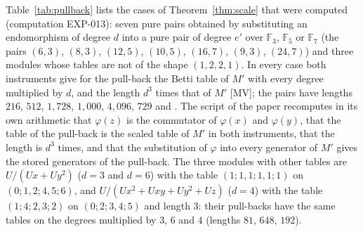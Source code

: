 \documentclass[11pt]{article}
\theoremstyle{definition}
\theoremstyle{remark}
\newcommand{\EXP}[1]{\mbox{EXP-#1}}
\newcommand{\F}{\mathbb{F}}
\begin{document}
Table~\ref{tab:pullback} lists the \npbCases{} cases of Theorem~\ref{thm:scale} that were computed (computation \EXP{013}): seven pure pairs obtained by substituting an endomorphism of degree $d$ into a pure pair of degree $e'$ over $\F_3$, $\F_5$ or $\F_7$ (the pairs $(6,3)$, $(8,3)$, $(12,5)$, $(10,5)$, $(16,7)$, $(9,3)$, $(24,7)$) and three modules whose tables are not of the shape $(1,2,2,1)$. In every case both instruments give for the pull-back the Betti table of $M'$ with every degree multiplied by $d$, and the length $d^3$ times that of $M'$ [MV]; the pairs have lengths $216$, $512$, $1{,}728$, $1{,}000$, $4{,}096$, $729$ and \npbMaxLength{}. The script of the paper recomputes in its own arithmetic that $\varphi(z)$ is the commutator of $\varphi(x)$ and $\varphi(y)$, that the table of the pull-back is the scaled table of $M'$ in both instruments, that the length is $d^3$ times, and that the substitution of $\varphi$ into every generator of $M'$ gives the stored generators of the pull-back. The three modules with other tables are $U/(Ux+Uy^2)$ ($d=3$ and $d=6$) with the table $(1;1,1;1,1;1)$ on $(0;1,2;4,5;6)$, and $U/(Ux^2+Uxy+Uy^2+Uz)$ ($d=4$) with the table $(1;4;2,3;2)$ on $(0;2;3,4;5)$ and length $3$: their pull-backs have the same tables on the degrees multiplied by $3$, $6$ and $4$ (lengths $81$, $648$, $192$).

\begin{table}[htbp]
\centering\footnotesize

\caption{The pull-backs computed: the case, the characteristic $p$, the degree $d$ of the endomorphism, the module $M'$, the pull-back (the pair $(e,p)$ of the new pure pair, or ``table'' for a module whose table is not pure) with the pair of forms over $\F_p$ obtained by substitution (or the Betti numbers of $M'$ in the order of the degrees), and the length of the pull-back; in every case the table of the pull-back is the table of $M'$ with degrees multiplied by $d$ in both instruments.}
\label{tab:pullback}
\end{table}
\end{document}

